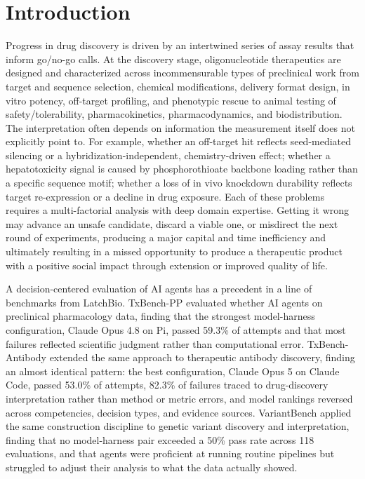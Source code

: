 \documentclass[11pt]{article}
\begin{document}
\section{Introduction}
Progress in drug discovery is driven by an intertwined series of assay results that inform go/no-go calls. At the discovery stage, oligonucleotide therapeutics are designed and characterized across incommensurable types of preclinical work from target and sequence selection, chemical modifications, delivery format design, in vitro potency, off-target profiling, and phenotypic rescue to animal testing of safety/tolerability, pharmacokinetics, pharmacodynamics, and biodistribution. The interpretation often depends on information the measurement itself does not explicitly point to. For example, whether an off-target hit reflects seed-mediated silencing or a hybridization-independent, chemistry-driven effect; whether a hepatotoxicity signal is caused by phosphorothioate backbone loading rather than a specific sequence motif; whether a loss of in vivo knockdown durability reflects target re-expression or a decline in drug exposure. Each of these problems requires a multi-factorial analysis with deep domain expertise. Getting it wrong may advance an unsafe candidate, discard a viable one, or misdirect the next round of experiments, producing  a major capital and time inefficiency and ultimately resulting in a missed opportunity to produce a therapeutic product with a positive social impact through extension or improved quality of life.

A decision-centered evaluation of AI agents has a precedent in a line of benchmarks from LatchBio. TxBench-PP evaluated whether AI agents on preclinical pharmacology data, finding that the strongest model-harness configuration, Claude Opus 4.8 on Pi, passed 59.3\% of attempts and that most failures reflected scientific judgment rather than computational error. TxBench-Antibody extended the same approach to therapeutic antibody discovery, finding an almost identical pattern: the best configuration, Claude Opus 5 on Claude Code, passed 53.0\% of attempts, 82.3\% of failures traced to drug-discovery interpretation rather than method or metric errors, and model rankings reversed across competencies, decision types, and evidence sources. VariantBench applied the same construction discipline to genetic variant discovery and interpretation, finding that no model-harness pair exceeded a 50\% pass rate across 118 evaluations, and that agents were proficient at running routine pipelines but struggled to adjust their analysis to what the data actually showed.
\end{document}
